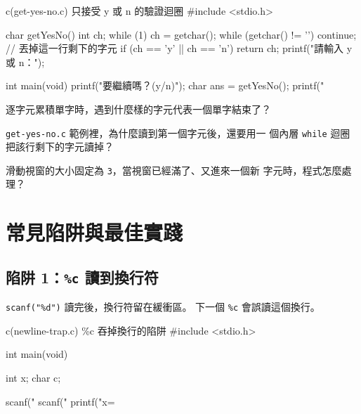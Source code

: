 \begin{example}{c}{(get-yes-no.c) 只接受 y 或 n 的驗證迴圈}
#include <stdio.h>

char getYesNo() {
    int ch;
    while (1) {
        ch = getchar();
        while (getchar() != '\n') {
            continue;              // 丟掉這一行剩下的字元
        }
        if (ch == 'y' || ch == 'n') {
            return ch;
        }
        printf("請輸入 y 或 n：\n");
    }
}

int main(void) {
    printf("要繼續嗎？(y/n)\n");
    char ans = getYesNo();
    printf("%
}
\end{example}



\begin{drills}[label=drills:char-advanced]
\item 逐字元累積單字時，遇到什麼樣的字元代表一個單字結束了？
\item \texttt{get-yes-no.c} 範例裡，為什麼讀到第一個字元後，還要用一
個內層 \texttt{while} 迴圈把該行剩下的字元讀掉？
\item 滑動視窗的大小固定為 \texttt{3}，當視窗已經滿了、又進來一個新
字元時，程式怎麼處理？
\end{drills}

\section{常見陷阱與最佳實踐}
\label{sec:char-pitfalls}

\subsection{陷阱 1：\texttt{\%c} 讀到換行符}

\texttt{scanf("\%d")} 讀完後，換行符留在緩衝區。 下一個 \texttt{\%c}
會誤讀這個換行。

\begin{example}{c}{(newline-trap.c) \%c 吞掉換行的陷阱}
#include <stdio.h>

int main(void) {
    int x;
    char c;

    scanf("%
    scanf("%
    printf("x=%
}
\end{example}

